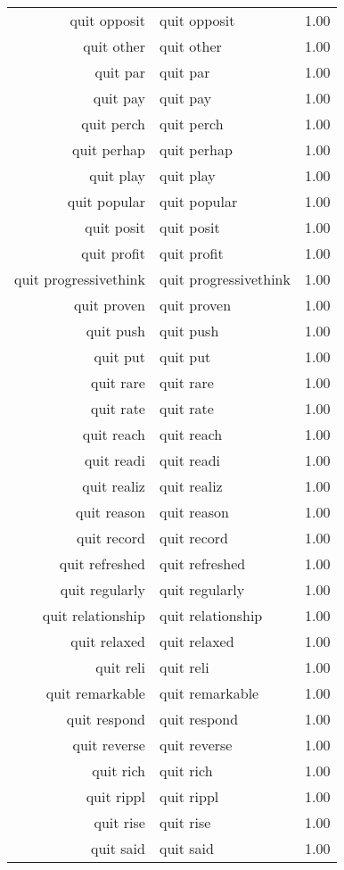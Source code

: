 \begin{table}[ht]
\begin{tabular}{rlr}
  quit opposit & quit opposit & 1.00 \\ 
  quit other & quit other & 1.00 \\ 
  quit par & quit par & 1.00 \\ 
  quit pay & quit pay & 1.00 \\ 
  quit perch & quit perch & 1.00 \\ 
  quit perhap & quit perhap & 1.00 \\ 
  quit play & quit play & 1.00 \\ 
  quit popular & quit popular & 1.00 \\ 
  quit posit & quit posit & 1.00 \\ 
  quit profit & quit profit & 1.00 \\ 
  quit progressivethink & quit progressivethink & 1.00 \\ 
  quit proven & quit proven & 1.00 \\ 
  quit push & quit push & 1.00 \\ 
  quit put & quit put & 1.00 \\ 
  quit rare & quit rare & 1.00 \\ 
  quit rate & quit rate & 1.00 \\ 
  quit reach & quit reach & 1.00 \\ 
  quit readi & quit readi & 1.00 \\ 
  quit realiz & quit realiz & 1.00 \\ 
  quit reason & quit reason & 1.00 \\ 
  quit record & quit record & 1.00 \\ 
  quit refreshed & quit refreshed & 1.00 \\ 
  quit regularly & quit regularly & 1.00 \\ 
  quit relationship & quit relationship & 1.00 \\ 
  quit relaxed & quit relaxed & 1.00 \\ 
  quit reli & quit reli & 1.00 \\ 
  quit remarkable & quit remarkable & 1.00 \\ 
  quit respond & quit respond & 1.00 \\ 
  quit reverse & quit reverse & 1.00 \\ 
  quit rich & quit rich & 1.00 \\ 
  quit rippl & quit rippl & 1.00 \\ 
  quit rise & quit rise & 1.00 \\ 
  quit said & quit said & 1.00 \\ 

\end{tabular}
\end{table}

